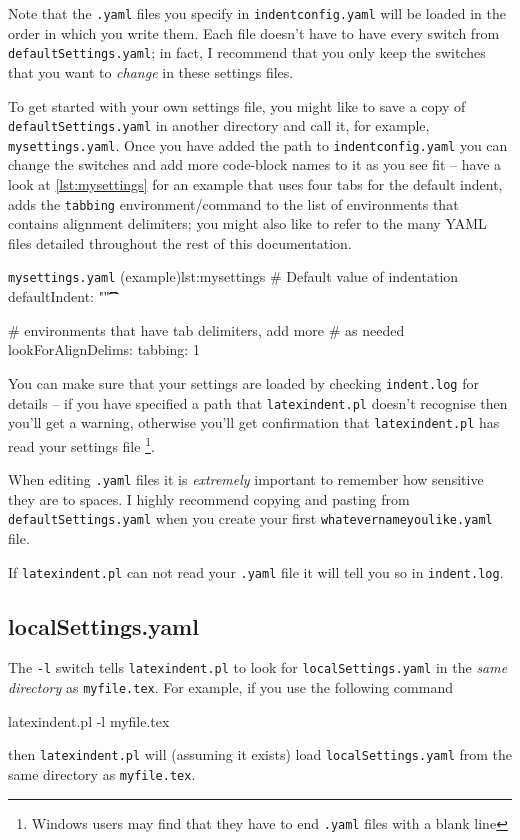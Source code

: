 	Note that the \texttt{.yaml} files you specify in \texttt{indentconfig.yaml} will be
	loaded in the order in which you write them. Each file doesn't have to have every switch
	from \texttt{defaultSettings.yaml}; in fact, I recommend that you only keep the switches that
	you want to \emph{change} in these settings files.

	To get started with your own settings file, you might like to save a copy of
	\texttt{defaultSettings.yaml} in another directory and call it, for example,
	\texttt{mysettings.yaml}. Once you have added the path to \texttt{indentconfig.yaml} you can
	change the switches and add more code-block names to it as you see fit -- have a look at
	\cref{lst:mysettings} for an example that uses four tabs for the default indent, adds
	the \texttt{tabbing} environment/command to the list of environments that contains
	alignment delimiters; you might also like to refer to the many YAML files detailed
	throughout the rest of this documentation.

	\begin{yaml}{\texttt{mysettings.yaml} (example)}{lst:mysettings}
# Default value of indentation
defaultIndent: "\t\t\t\t"

# environments that have tab delimiters, add more
# as needed
lookForAlignDelims:
    tabbing: 1
\end{yaml}

	You can make sure that your settings are loaded by checking \texttt{indent.log} for
	details -- if you have specified a path that \texttt{latexindent.pl} doesn't recognise
	then you'll get a warning, otherwise you'll get confirmation that \texttt{latexindent.pl}
	has read your settings file \footnote{Windows users
		may find that they have to end \texttt{.yaml} files with a blank line}.

	\begin{warning}
		When editing \texttt{.yaml} files it is \emph{extremely} important
		to remember how sensitive they are to spaces. I highly recommend copying
		and pasting from \texttt{defaultSettings.yaml} when you create your
		first \texttt{whatevernameyoulike.yaml} file.

		If \texttt{latexindent.pl} can not read your \texttt{.yaml} file it
		will tell you so in \texttt{indent.log}.
	\end{warning}

\subsection{localSettings.yaml}\label{sec:localsettings}
	The \texttt{-l} switch tells \texttt{latexindent.pl} to look for
	\texttt{localSettings.yaml} in the \emph{same directory} as \texttt{myfile.tex}.  For
	example, if you use the following command
	\begin{commandshell}
latexindent.pl -l myfile.tex
\end{commandshell}
	then \texttt{latexindent.pl} will (assuming it exists) load \texttt{localSettings.yaml} from
	the same directory as \texttt{myfile.tex}.

